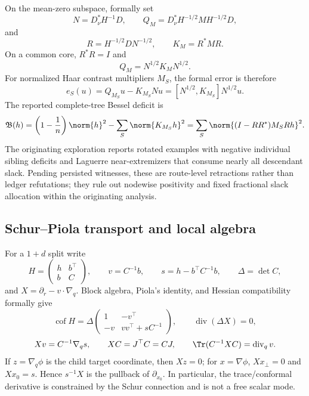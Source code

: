 \documentclass[../../main.tex]{subfiles}
\begin{document}
On the mean-zero subspace, formally set
\[
  N=D_\nu^*H^{-1}D,
  \qquad
  Q_M=D_\nu^*H^{-1/2}MH^{-1/2}D,
\]
and
\[
  R=H^{-1/2}DN^{-1/2},
  \qquad K_M=R^*MR.
\]
On a common core, $R^*R=I$ and
\[
  Q_M=N^{1/2}K_MN^{1/2}.
\]
For normalized Haar contrast multipliers $M_S$, the formal error is therefore
\begin{equation}
  e_S(u)=Q_{M_S}u-K_{M_S}Nu
  =[N^{1/2},K_{M_S}]N^{1/2}u.
  \label{eq:mm-commutator-error}
\end{equation}
The reported complete-tree Bessel deficit is
\begin{equation}
  \mathfrak B(h)
  =\left(1-\frac1n\right)\norm{h}^2-\sum_S\norm{K_{M_S}h}^2
  =\sum_S\norm{(I-RR^*)M_SRh}^2.
  \label{eq:mm-bessel-deficit}
\end{equation}
The originating exploration reports rotated examples with negative individual sibling deficits
and Laguerre near-extremizers that consume nearly all descendant slack. Pending persisted
witnesses, these are route-level retractions rather than ledger refutations; they rule out
nodewise positivity and fixed fractional slack allocation within the originating analysis.

\subsection{Schur--Piola transport and local algebra}

For a $1+d$ split write
\[
  H=\begin{pmatrix}h&b^\top\\ b&C\end{pmatrix},\qquad
  v=C^{-1}b,\qquad s=h-b^\top C^{-1}b,\qquad \Delta=\det C,
\]
and $X=\partial_r-v\cdot\nabla_q$. Block algebra, Piola's identity, and Hessian compatibility
formally give
\[
  \operatorname{cof}H
  =\Delta\begin{pmatrix}1&-v^\top\\-v&vv^\top+sC^{-1}\end{pmatrix},
  \qquad
  \operatorname{div}(\Delta X)=0,
\]
\[
  Xv=C^{-1}\nabla_qs,
  \qquad XC=J^\top C=CJ,
  \qquad \Tr(C^{-1}XC)=\operatorname{div}_qv.
\]
If $z=\nabla_q\phi$ is the child target coordinate, then $Xz=0$; for
$x=\nabla\phi$, $Xx_\perp=0$ and $Xx_0=s$. Hence $s^{-1}X$ is the pullback of
$\partial_{x_0}$. In particular, the trace/conformal derivative is constrained by the Schur
connection and is not a free scalar mode.
\end{document}
